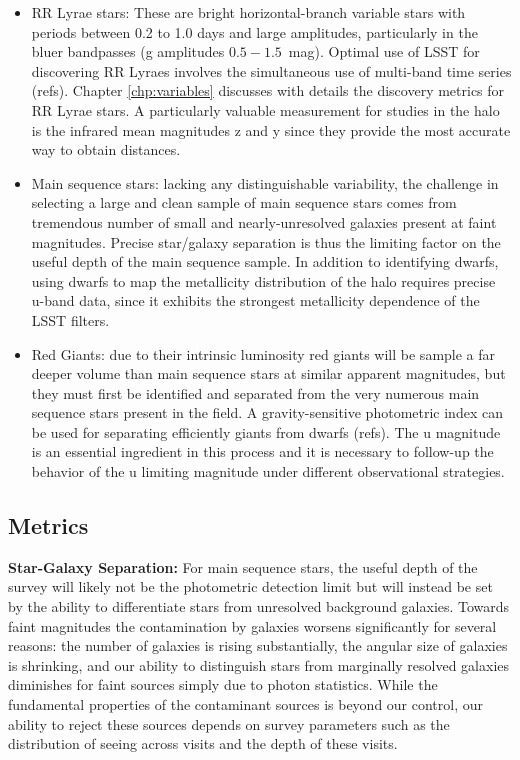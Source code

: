 \begin{itemize}

\item RR Lyrae stars: These are bright horizontal-branch variable stars with
periods between 0.2 to 1.0 days and large amplitudes, particularly in the bluer 
bandpasses (g amplitudes $0.5 - 1.5$~mag). Optimal use of LSST for discovering
RR Lyraes involves the simultaneous use of multi-band time series (refs).
Chapter \ref{chp:variables} discusses with details the discovery metrics for RR Lyrae stars.
A particularly valuable measurement for studies in the halo is the infrared mean
magnitudes z and y since they provide the most accurate way to obtain 
distances.

\item Main sequence stars: lacking any distinguishable variability, the
challenge in selecting a large and clean sample of main sequence stars comes
from tremendous number of small and nearly-unresolved galaxies present at
faint magnitudes. Precise star/galaxy separation is thus the limiting factor
on the useful depth of the main sequence sample. In addition to identifying
dwarfs, using dwarfs to map the metallicity distribution of the halo requires
precise u-band data, since it exhibits the strongest metallicity dependence of
the LSST filters.

\item Red Giants: due to their intrinsic luminosity red giants will be sample
a far deeper volume than main sequence stars at similar apparent magnitudes,
but they must first be identified and separated from the very numerous main
sequence stars present in the field. A gravity-sensitive photometric index can
be used for separating efficiently giants from dwarfs (refs). The u magnitude
is an essential ingredient in this process and it is necessary to follow-up
the behavior of the u limiting magnitude under different observational
strategies.

\end{itemize}


\subsection{Metrics}
\label{sec:\secname:MW_Halo_metrics}

\textbf{Star-Galaxy Separation:} For main sequence stars, the useful depth of
the survey will likely not be the photometric detection limit but will instead
be set by the ability to differentiate stars from unresolved background
galaxies. Towards faint magnitudes the contamination by galaxies worsens
significantly for several reasons: the number of galaxies is rising
substantially, the angular size of galaxies is shrinking, and our ability to
distinguish stars from marginally resolved galaxies diminishes for faint
sources simply due to photon statistics. While the fundamental properties of
the contaminant sources is beyond our control, our ability to reject these
sources depends on survey parameters such as the distribution of seeing across
visits and the depth of these visits.

